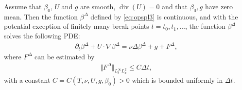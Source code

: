 \documentclass[reqno,12pt]{amsart}
\DeclareMathOperator{\dv}{div}
\begin{document}
\begin{lemma}
\label{lem:tildeeq}
Assume that $\beta_0$, $U$ and $g$ are smooth, $\dv(U) = 0$ and that $\beta_0, g$ have zero mean. Then the function ${\beta}^\Delta$ defined by \eqref{eq:opspl3} is continuous, and with the potential exception of finitely many break-points $t=t_0,t_1,\dots$, the function $\beta^\Delta$ solves the following PDE:
\begin{align}
\label{eq:opspliteq}
\partial_t {\beta}^\Delta + U \cdot \nabla {\beta}^\Delta
=
\nu \Delta {\beta}^\Delta + g + F^\Delta,
\end{align}
where $F^\Delta$ can be estimated by
\begin{align}
\label{eq:Fdelta}
\Vert F^\Delta \Vert_{L^\infty_t L^2_x} \le C\Delta t,
\end{align}
with a constant $C = C(T,\nu, U,g, \beta_0) > 0$ which is bounded
uniformly in $\Delta t$.
\end{lemma}
\end{document}
